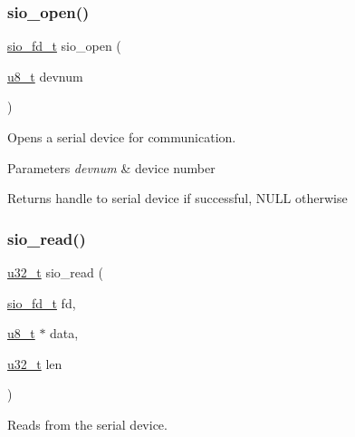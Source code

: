 \subsubsection{\texorpdfstring{sio\+\_\+open()}{sio\_open()}}
{\footnotesize\ttfamily \hyperlink{native_2lwip_2src_2include_2lwip_2sio_8h_ac868e938508a529a77cdc81a6765bd0b}{sio\+\_\+fd\+\_\+t} sio\+\_\+open (\begin{DoxyParamCaption}\item[{\hyperlink{group__compiler__abstraction_ga4caecabca98b43919dd11be1c0d4cd8e}{u8\+\_\+t}}]{devnum }\end{DoxyParamCaption})}

Opens a serial device for communication.


\begin{DoxyParams}{Parameters}
{\em devnum} & device number \\
\hline
\end{DoxyParams}
\begin{DoxyReturn}{Returns}
handle to serial device if successful, N\+U\+LL otherwise 
\end{DoxyReturn}
\mbox{\label{openmote-cc2538_2lwip_2src_2include_2lwip_2sio_8h_ac5a6563ee5f12459451010139a04a03b}} 
\subsubsection{\texorpdfstring{sio\+\_\+read()}{sio\_read()}}
{\footnotesize\ttfamily \hyperlink{group__compiler__abstraction_ga4c14294869aceba3ef9d4c0c302d0f33}{u32\+\_\+t} sio\+\_\+read (\begin{DoxyParamCaption}\item[{\hyperlink{native_2lwip_2src_2include_2lwip_2sio_8h_ac868e938508a529a77cdc81a6765bd0b}{sio\+\_\+fd\+\_\+t}}]{fd,  }\item[{\hyperlink{group__compiler__abstraction_ga4caecabca98b43919dd11be1c0d4cd8e}{u8\+\_\+t} $\ast$}]{data,  }\item[{\hyperlink{group__compiler__abstraction_ga4c14294869aceba3ef9d4c0c302d0f33}{u32\+\_\+t}}]{len }\end{DoxyParamCaption})}

Reads from the serial device.


